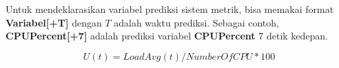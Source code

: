 \begin{enumerate}
        Untuk mendeklarasikan variabel prediksi sistem metrik, bisa memakai format \textbf{Variabel[+T]} dengan $T$ adalah waktu prediksi. Sebagai contoh, \textbf{CPUPercent[+7]} adalah prediksi variabel \textbf{CPUPercent} 7 detik kedepan.

        \begin{equation}
            \label{eq:load-average}
            U(t) = LoadAvg(t)/NumberOfCPU*100
        \end{equation}
\end{enumerate}